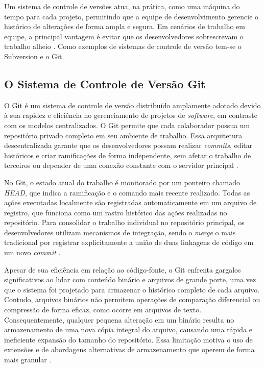 Um sistema de controle de versões atua, na prática, como uma máquina do tempo para cada projeto, permitindo que a equipe de desenvolvimento gerencie o histórico de alterações de forma ampla e segura. Em cenários de trabalho em equipe, a principal vantagem é evitar que os desenvolvedores sobrescrevam o trabalho alheio \cite{Spinellis2005}. Como exemplos de sistemas de controle de versão tem-se o Subversion e o Git. 

\subsection{O Sistema de Controle de Versão Git}

O Git é um sistema de controle de versão distribuído amplamente adotado devido à sua rapidez e eficiência no gerenciamento de projetos de \textit{software}, em contraste com os modelos centralizados. O Git permite que cada colaborador possua um repositório privado completo em seu ambiente de trabalho. Essa arquitetura descentralizada garante que os desenvolvedores possam realizar \textit{commits}, editar históricos e criar ramificações de forma independente, sem afetar o trabalho de terceiros ou depender de uma conexão constante com o servidor principal \cite{Cunha2018}.

No Git, o estado atual do trabalho é monitorado por um ponteiro chamado \textit{HEAD}, que indica a ramificação e o comando mais recente realizado. Todas as ações executadas localmente são registradas automaticamente em um arquivo de registro, que funciona como um rastro histórico das ações realizadas no repositório. Para consolidar o trabalho individual no repositório principal, os desenvolvedores utilizam mecanismos de integração, sendo o \textit{merge} o mais tradicional por registrar explicitamente a união de duas linhagens de código em um novo \textit{commit} \cite{Cunha2018}.

Apesar de sua eficiência em relação ao código-fonte, o Git enfrenta gargalos significativos ao lidar com conteúdo binário e arquivos de grande porte, uma vez que o sistema foi projetado para armazenar o histórico completo de cada arquivo. Contudo,  arquivos binários não permitem operações de comparação diferencial ou compressão de forma eficaz, como ocorre em arquivos de texto. Consequentemente, qualquer pequena alteração em um binário resulta no armazenamento de uma nova cópia integral do arquivo, causando uma rápida e ineficiente expansão do tamanho do repositório. Essa limitação motiva o uso de extensões e de abordagens alternativas de armazenamento que operem de forma mais granular \cite{Chen2025}.

